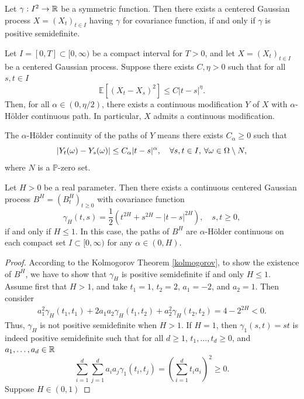 \begin{thm}\label{kolmogorov}
    Let $\gamma: I^{2}\to\mathbb{R}$ be a symmetric function. Then there exists a centered Gaussian process $X=(X_{t})_{t\in I}$ having $\gamma$ for covariance function, if and only if $\gamma$ is positive semidefinite.
\end{thm}
\begin{lem}
    Let $I=[0,T]\subset [0,\infty)$ be a compact interval for $T>0$, and let $X=(X_{t})_{t\in I}$ be a centered Gaussian process. Suppose there exists $C,\eta>0$ such that for all $s,t\in I$
    \begin{equation}
        \mathbb{E}\left[(X_{t}-X_{s})^{2}\right]\leq C|t-s|^{\eta}.
    \end{equation}
    Then, for all $\alpha\in (0,\eta/2)$, there exists a continuous modification $Y$ of $X$ with $\alpha$-Hölder continuous path. In particular, $X$ admits a continuous modification.
\end{lem}
The $\alpha$-Hölder continuity of the paths of $Y$ means there exists $C_{\alpha}\geq 0$ such that
\begin{equation}
    |Y_{t}(\omega)-Y_{s}(\omega)|\leq C_{\alpha}|t-s|^{\alpha},\quad \forall s,t\in I,\hspace{2 pt}\forall\omega\in\Omega\setminus N,
\end{equation}
where $N$ is a $\mathbb{P}$-zero set.
\begin{thm}\label{existencethm}
  Let $H>0$ be a real parameter. Then there exists a continuous centered Gaussian process $B^{H}=(B_{t}^{H})_{t\geq 0}$ with covariance function
  \begin{equation}
      \gamma_{H}(t,s)=\frac{1}{2}(t^{2H}+s^{2H}-|t-s|^{2H}), \quad s,t\geq 0,
  \end{equation}
  if and only if $H\leq 1$. In this case, the paths of $B^{H}$ are $\alpha$-Hölder continuous on each compact set $I\subset [0,\infty)$ for any $\alpha\in (0,H)$.
\end{thm}
\begin{proof}
    According to the Kolmogorov Theorem \ref{kolmogorov}, to show the existence of $B^{H}$, we have to show that $\gamma_{H}$ is positive semidefinite if and only $H\leq 1$.
    Assume first that $H>1$, and take $t_{1}=1$, $t_{2}=2$, $a_{1}=-2$, and $a_{2}=1$. Then consider
    \begin{align}
        a_{1}^{2}\gamma_{H}(t_{1},t_{1})+2a_{1}a_{2}\gamma_{H}(t_{1},t_{2})+a_{2}^{2}\gamma_{H}(t_{2},t_{2})=4-2^{2H}<0.
    \end{align}
    Thus, $\gamma_{H}$ is not positive semidefinite when $H>1$. If $H=1$, then $\gamma_{1}(s,t)=st$ is indeed positive semidefinite such that for all $d\geq 1$, $t_{1},\dots,t_{d}\geq 0$, and $a_{1},\dots,a_{d}\in \mathbb{R}$
    \begin{equation}
        \sum_{i=1}^{d}\sum_{j=1}^{d}a_{i}a_{j}\gamma_{1}(t_{i},t_{j})= \left(\sum_{i=1}^{d}t_{i}a_{i}\right)^{2}\geq 0.
    \end{equation}
    Suppose $H\in (0,1)$
\end{proof}
